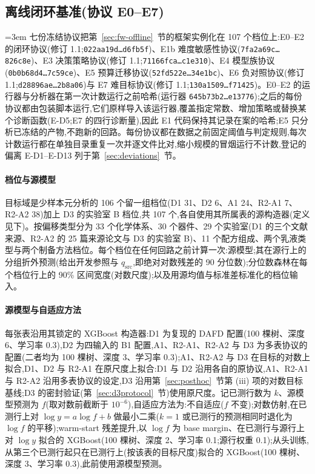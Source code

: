 \documentclass[11pt,a4paper]{ctexart}
\newcommand{\hashtrunc}[2]{\texttt{#1\ldots#2}}
\begin{document}
\subsection{离线闭环基准(协议 E0--E7)}
\label{sec:eloop}
\begingroup\emergencystretch=3em\relax
七份冻结协议把第~\ref{sec:fw-offline}~节的框架实例化在 107 个档位上:E0--E2 的闭环协议(修订 1.1;\hashtrunc{022aa19d}{d6fb5f})、E1b 难度敏感性协议(\hashtrunc{7fa2a69c}{826c8e})、E3 决策策略协议(修订 1.1;\hashtrunc{71166fca}{c1e310})、E4 模型族协议(\hashtrunc{0b0b68d4}{7c59ce})、E5 预算迁移协议(\hashtrunc{52fd522e}{34e1bc})、E6 负对照协议(修订 1.1;\hashtrunc{d28896ae}{2b8a06})与 E7 难目标协议(修订 1.1;\hashtrunc{130a1509}{f71425})。E0--E2 的运行器与分析器在第一次计数运行之前哈希(运行器 \hashtrunc{645b73b2}{e13776});之后的每份协议都由包装脚本运行,它们原样导入该运行器,覆盖指定常数、增加策略或替换某个诊断函数(E-D5;E7 的四行诊断量),因此 E1 代码保持其记录在案的哈希;E5 只分析已冻结的产物,不跑新的回路。每份协议都在数据之前固定阈值与判定规则,每次计数运行都在单独目录重复一次并逐文件比对,缩小规模的冒烟运行不计数,登记的偏离 E-D1--E-D13 列于第~\ref{sec:deviations}~节。\par\endgroup

\paragraph{档位与源模型} 目标域是少样本元分析的 106 个留一组档位(D1 31、D2 6、A1 24、R2-A1 7、R2-A2 38)加上 D3 的实验室 B 档位,共 107 个,各自使用其所属表的源构造器(定义见下)。按偏移类型分为 33 个化学体系、30 个器件、29 个实验室(D1 的三个文献来源、R2-A2 的 25 篇来源论文与 D3 的实验室 B)、11 个配方组成、两个乳液类型与两个制备方法档位。每个档位在任何回路之前计算一次:源模型;其在源行上的分组折外预测(给出开发参照与 $q_{\mathrm{src}}$,即绝对对数残差的 90 分位数);分位数森林在每个档位行上的 90\% 区间宽度(对数尺度);以及用源均值与标准差标准化的档位输入。

\paragraph{源模型与自适应方法}\label{sec:adapt} 每张表沿用其锁定的 XGBoost 构造器:D1 为复现的 DAFD 配置(100 棵树、深度 6、学习率 0.3),D2 为四输入的 B1 配置,A1、R2-A1、R2-A2 与 D3 为多表协议的配置(二者均为 100 棵树、深度 3、学习率 0.3);A1、R2-A2 与 D3 在目标的对数上拟合,D1、D2 与 R2-A1 在原尺度上拟合:D1 与 D2 沿用各自的原协议,A1、R2-A1 与 R2-A2 沿用多表协议的设定,D3 沿用第~\ref{sec:posthoc}~节第 (iii) 项的对数目标基线;D3 的密封验证(第~\ref{sec:d3protocol}~节)使用原尺度。记已测行数为 $k$、源模型预测为 $f$(取对数前截断于 $10^{-6}$),自适应方法为:不自适应($f$ 不变);对数仿射,在已测行上对 $\log y = a \log f + b$ 做最小二乘($k = 1$ 或已测行的预测相同时退化为 $\log f$ 的平移);warm-start 残差提升,以 $\log f$ 为 base margin、在已测行与源行上对 $\log y$ 拟合的 XGBoost(100 棵树、深度 2、学习率 0.1;源行权重 0.1);从头训练,从第三个已测行起只在已测行上(按该表的目标尺度)拟合的 XGBoost(100 棵树、深度 3、学习率 0.3),此前使用源模型预测。
\end{document}
